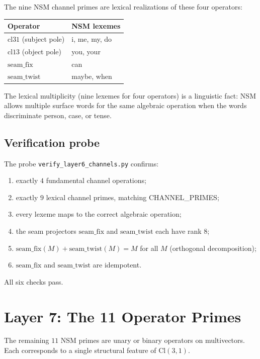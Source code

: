 \documentclass[11pt,a4paper]{article}
\theoremstyle{plain}
\theoremstyle{definition}
\theoremstyle{remark}
\numberwithin{equation}{section}
\providecommand{\Cl}{\mathrm{Cl}}
\providecommand{\seamfix}{\mathrm{seam\_fix}}
\providecommand{\seamtwist}{\mathrm{seam\_twist}}
\begin{document}
The nine NSM channel primes are lexical realizations of these four
operators:
\begin{center}
\begin{tabular}{ll}
\toprule
Operator & NSM lexemes \\
\midrule
$\mathrm{cl31}$ (subject pole) & \textsf{i, me, my, do} \\
$\mathrm{cl13}$ (object pole) & \textsf{you, your} \\
$\seamfix$ & \textsf{can} \\
$\seamtwist$ & \textsf{maybe, when} \\
\bottomrule
\end{tabular}
\end{center}

The lexical multiplicity (nine lexemes for four operators) is a
linguistic fact: NSM allows multiple surface words for the same
algebraic operation when the words discriminate person, case, or
tense.

\subsection{Verification probe}

The probe \texttt{verify\_layer6\_channels.py} confirms:
\begin{enumerate}[label=(\alph*)]
\item exactly $4$ fundamental channel operations;
\item exactly $9$ lexical channel primes, matching CHANNEL\_PRIMES;
\item every lexeme maps to the correct algebraic operation;
\item the seam projectors $\seamfix$ and $\seamtwist$ each have
      rank $8$;
\item $\seamfix(M) + \seamtwist(M) = M$ for all $M$ (orthogonal
      decomposition);
\item $\seamfix$ and $\seamtwist$ are idempotent.
\end{enumerate}
All six checks pass.


\section{Layer 7: The 11 Operator Primes}\label{sec:layer7}

The remaining $11$ NSM primes are unary or binary operators on
multivectors.  Each corresponds to a single structural feature of
$\Cl(3,1)$.
\end{document}
